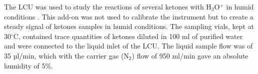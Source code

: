 The LCU was used to study the reactions of several ketones with H$_3$O$^+$ in humid conditions \cite{malaskova2019compendium}.
This add-on was not used to calibrate the instrument but to create a steady signal of ketones samples in humid conditions. %
%
The sampling vials, kept at 30$^{\circ}$C, contained  trace quantities of  ketones  diluted in 100 ml of purified water and were  connected to the liquid inlet of the LCU. The liquid sample flow was of 35 µl/min, which with the carrier gas (N$_2$) flow of 950 ml/min gave an absolute humidity of 5\%.
%









